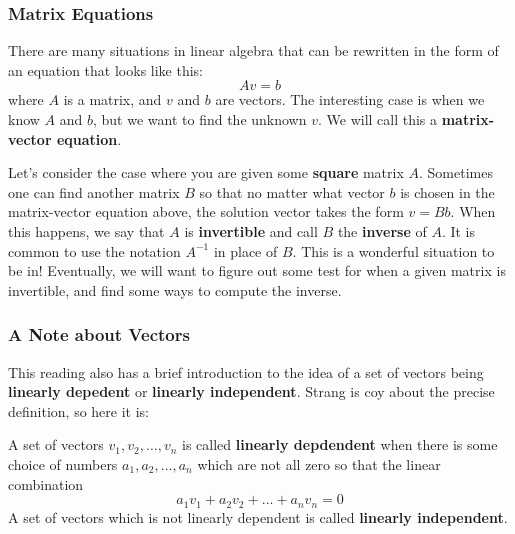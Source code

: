 \documentclass[10pt,]{book}
\newcommand{\terminology}[1]{\textbf{#1}}
\theoremstyle{plain}
\theoremstyle{definition}
\numberwithin{equation}{section}
\begin{document}
\subsubsection[Matrix Equations]{Matrix Equations}\label{subsubsection-5}

        There are many situations in linear algebra that can be rewritten in
        the form of an equation that looks like this:\[
          A v = b
        \]
        where \(A\) is a matrix, and \(v\) and \(b\) are vectors. The
        interesting case is when we know \(A\) and \(b\), but we want to
        find the unknown \(v\). We will call this a
        \terminology{matrix-vector equation}.
\par

        Let's consider the case where you are given some \terminology{square}
        matrix \(A\). Sometimes one can find another matrix \(B\) so that
        no matter what vector \(b\) is chosen in the matrix-vector equation
        above, the  solution vector takes the form \(v = Bb\). When this
        happens, we say that \(A\) is \terminology{invertible} and call \(B\)
        the \terminology{inverse} of \(A\). It is common to use the notation
        \(A^{-1}\) in place of \(B\). This is a wonderful situation to be
        in! Eventually, we will want to figure out some test for when a given
        matrix is invertible, and find some ways to compute the inverse.
\typeout{************************************************}
\typeout{************************************************}
\subsubsection[A Note about Vectors]{A Note about Vectors}\label{subsubsection-6}

        This reading also has a brief introduction to the idea of a set of
        vectors being \terminology{linearly depedent} or \terminology{linearly independent}.
        Strang is coy about the precise definition, so here it is:
\par

        A set of vectors \(v_1, v_2, \dots, v_n\) is called \terminology{linearly
        depdendent} when there is some choice of numbers
        \(a_1, a_2, \dots, a_n\) which are not all zero so that the
        linear combination\[
          a_1 v_1 + a_2 v_2 + \dots + a_n v_n = 0
        \]
        A set of vectors which is not linearly dependent is called
        \terminology{linearly independent}.
\par
\end{document}
